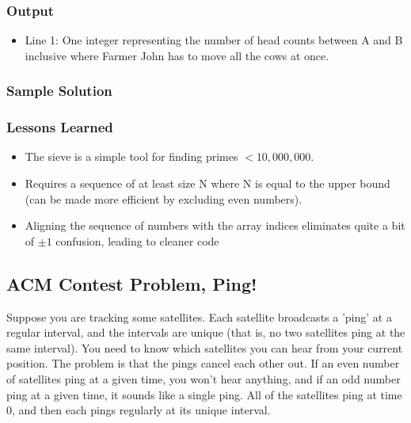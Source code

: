
\subsubsection{Output}
\begin{itemize}
	\item Line 1: One integer representing the number of head counts between A and B inclusive where Farmer John has to move all the cows at once.
\end{itemize}


\subsubsection{Sample Solution}

\subsubsection{Lessons Learned}
\begin{itemize}
	\item The sieve is a simple tool for finding primes $<10,000,000$.
	\item Requires a sequence of at least size N where N is equal to the upper bound (can be made more efficient by excluding even numbers).
	\item Aligning the sequence of numbers with the array indices eliminates quite a bit of $\pm1$ confusion, leading to cleaner code
\end{itemize}

\subsection{ACM Contest Problem, Ping!\cite{acmsoutheastregional2013}}
Suppose you are tracking some satellites.
Each satellite broadcasts a 'ping' at a regular interval, and the intervals are unique (that is, no two satellites ping at the same interval).
You need to know which satellites you can hear from your current position.
The problem is that the pings cancel each other out.
If an even number of satellites ping at a given time, you won't hear anything, and if an odd number ping at a given time, it sounds like a single ping.
All of the satellites ping at time 0, and then each pings regularly at its unique interval.


